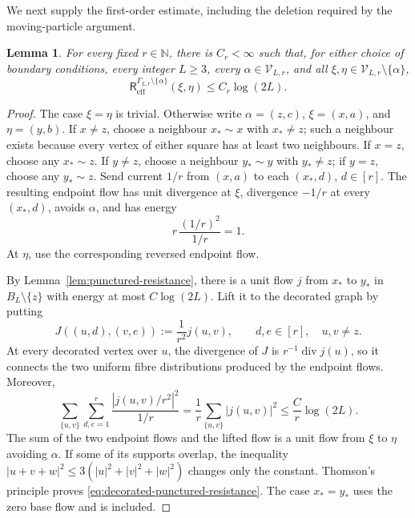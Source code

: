 \documentclass[11pt]{article}
\numberwithin{equation}{section}
\newtheorem{lemma}[theorem]{Lemma}
\theoremstyle{remark}
\newcommand{\1}{\mathbf 1}
\begin{document}
We next supply the first-order estimate, including the deletion required
by the moving-particle argument.

\begin{lemma}
\label{lem:decorated-punctured-resistance}
For every fixed \(r\in\mathbb N\), there is \(C_r<\infty\) such that, for
either choice of boundary conditions, every integer \(L\geq3\), every
\(\alpha\in\mathcal V_{L,r}\), and all
\(\xi,\eta\in\mathcal V_{L,r}\setminus\{\alpha\}\),
\begin{equation}
 \mathsf R_{\mathrm{eff}}^{\Gamma_{L,r}\setminus\{\alpha\}}
 (\xi,\eta)\leq C_r\log(2L).
 \label{eq:decorated-punctured-resistance}
\end{equation}
\end{lemma}

\begin{proof}
The case \(\xi=\eta\) is trivial.  Otherwise write
\(\alpha=(z,c)\), \(\xi=(x,a)\), and \(\eta=(y,b)\).  If \(x\ne z\),
choose a neighbour \(x_*\sim x\) with \(x_*\ne z\); such a neighbour
exists because every vertex of either square has at least two neighbours.
If \(x=z\), choose any \(x_*\sim z\).  If \(y\ne z\), choose a neighbour
\(y_*\sim y\) with \(y_*\ne z\); if \(y=z\), choose any \(y_*\sim z\).
Send current \(1/r\) from \((x,a)\) to each \((x_*,d)\), \(d\in[r]\).
The resulting endpoint flow has unit divergence at \(\xi\), divergence
\(-1/r\) at every
\((x_*,d)\), avoids \(\alpha\), and has energy
\begin{equation}
 r\,\frac{(1/r)^2}{1/r}=1.
 \label{eq:decorated-fan-energy}
\end{equation}
At \(\eta\), use the corresponding reversed endpoint flow.

By Lemma~\ref{lem:punctured-resistance}, there is a unit flow \(j\) from
\(x_*\) to \(y_*\) in \(B_L\setminus\{z\}\) with energy at most
\(C\log(2L)\).  Lift it to the decorated graph by putting
\[
 J((u,d),(v,e)):=\frac1{r^2}j(u,v),
 \qquad d,e\in[r],\quad u,v\ne z.
\]
At every decorated vertex over \(u\), the divergence of \(J\) is
\(r^{-1}\operatorname{div}j(u)\), so it connects the two uniform fibre
distributions produced by the endpoint flows.  Moreover,
\begin{equation}
 \sum_{\{u,v\}}\sum_{d,e=1}^r
 \frac{|j(u,v)/r^2|^2}{1/r}
 =\frac1r\sum_{\{u,v\}}|j(u,v)|^2
 \leq\frac Cr\log(2L).
 \label{eq:decorated-lifted-flow-energy}
\end{equation}
The sum of the two endpoint flows and the lifted flow is a unit flow from \(\xi\)
to \(\eta\) avoiding \(\alpha\).  If some of its supports overlap, the
inequality \(|u+v+w|^2\leq3(|u|^2+|v|^2+|w|^2)\) changes only the constant.
Thomson's principle proves
\eqref{eq:decorated-punctured-resistance}.  The case \(x_*=y_*\) uses the
zero base flow and is included.
\end{proof}
\end{document}
